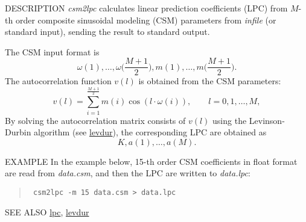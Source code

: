 \begin{synopsis}
\item [csm2lpc] [ --m $M$ ] [ --f $F$ ] [ {\em infile} ] 
\end{synopsis}

\begin{qsection}{DESCRIPTION}
{\em csm2lpc} calculates linear prediction coefficients (LPC) 
from $M$-th order composite sinusoidal modeling (CSM) parameters 
from {\em infile} (or standard input),
sending the result to standard output.

The CSM input format is
\begin{displaymath}
   \omega(1), \dots , \omega\biggl(\frac{M+1}{2}\biggr), m(1), \dots , m\biggl(\frac{M+1}{2}\biggr).
\end{displaymath}
The autocorrelation function $v(l)$ is obtained from the CSM parameters:
\begin{displaymath}
   v(l)=\sum_{i=1}^{\frac{M+1}{2}}m(i)\cos(l\cdot\omega(i)), \qquad l=0,1,\dots,M,
\end{displaymath}
By solving the autocorrelation matrix consists of $v(l)$ using the
Levinson-Durbin algorithm (see \hyperlink{levdur}{levdur}), the corresponding LPC are obtained as
\begin{displaymath}
   K , a(1), \dots , a(M).
\end{displaymath}

\end{qsection}

\begin{options}
\end{options}

\begin{qsection}{EXAMPLE}
In the example below, 15-th order CSM coefficients in float format
are read from {\em data.csm}, and then the LPC are written to {\em data.lpc}:
\begin{quote}
\verb! csm2lpc -m 15 data.csm > data.lpc!
\end{quote}
\end{qsection}

\begin{qsection}{SEE ALSO}
\hyperlink{lpc}{lpc},
\hyperlink{levdur}{levdur}
\end{qsection}
